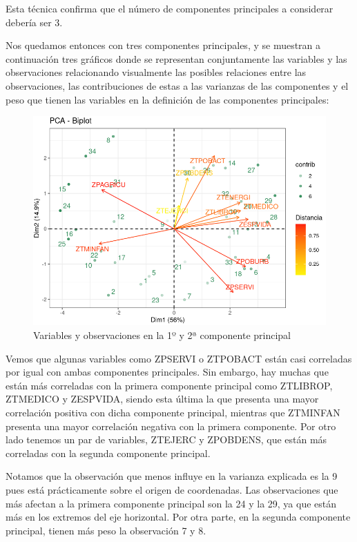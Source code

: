 \documentclass[11pt,a4paper]{article}
\begin{document}
    Esta técnica confirma que el número de componentes principales a considerar debería ser 3. 
    
    Nos quedamos entonces con tres componentes principales, y se muestran a continuación tres gráficos donde se representan conjuntamente las variables y las observaciones relacionando visualmente las posibles relaciones entre las observaciones, las contribuciones de estas a las varianzas de las componentes y el peso que tienen las variables en la definición de las componentes principales:
    
    \begin{figure}[H]
    	    \centering
    	    \includegraphics[scale=0.5]{pca4.png}
    	    \caption{Variables y observaciones en la 1º y 2ª componente principal}
    	    \label{pca4}
    	\end{figure}
    	
    	Vemos que algunas variables como ZPSERVI o ZTPOBACT están casi correladas por igual con ambas componentes principales. Sin embargo, hay muchas que están más correladas con la primera componente principal como ZTLIBROP, ZTMEDICO y ZESPVIDA, siendo esta última la que presenta una mayor correlación positiva con dicha componente principal, mientras que ZTMINFAN presenta una mayor correlación negativa con la primera componente. Por otro lado tenemos un par de variables, ZTEJERC y ZPOBDENS, que están más correladas con la segunda componente principal.
    	
    	Notamos que la observación que menos influye en la varianza explicada es la 9 pues está prácticamente sobre el origen de coordenadas. Las observaciones que más afectan a la primera componente principal son la 24 y la 29, ya que están más en los extremos del eje horizontal. Por otra parte, en la segunda componente principal, tienen más peso la observación 7 y 8.
    	
\end{document}
